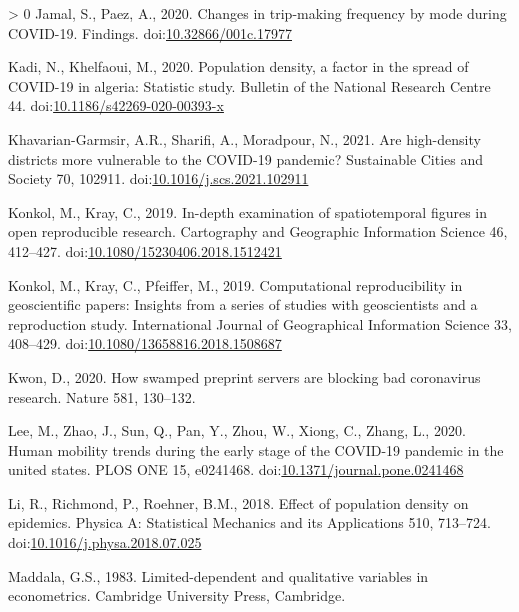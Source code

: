 \documentclass[]{elsarticle} %
\newlength{\cslhangindent}
\newenvironment{CSLReferences}[3] %
 {%
  \setlength{\parindent}{0pt}
  \ifodd #1 \everypar{\setlength{\hangindent}{\cslhangindent}}\ignorespaces\fi
  \ifnum #2 > 0
  \setlength{\parskip}{#2\baselineskip}
  \fi
 }%
 {}
\begin{document}
\begin{CSLReferences}{1}{0}
\leavevmode\hypertarget{ref-Jamal2020Changes}{}%
Jamal, S., Paez, A., 2020. Changes in trip-making frequency by mode
during COVID-19. Findings.
doi:\href{https://doi.org/10.32866/001c.17977}{10.32866/001c.17977}

\leavevmode\hypertarget{ref-Kadi2020population}{}%
Kadi, N., Khelfaoui, M., 2020. Population density, a factor in the
spread of COVID-19 in algeria: Statistic study. Bulletin of the National
Research Centre 44.
doi:\href{https://doi.org/10.1186/s42269-020-00393-x}{10.1186/s42269-020-00393-x}

\leavevmode\hypertarget{ref-Khavarian2021high}{}%
Khavarian-Garmsir, A.R., Sharifi, A., Moradpour, N., 2021. Are
high-density districts more vulnerable to the COVID-19 pandemic?
Sustainable Cities and Society 70, 102911.
doi:\href{https://doi.org/10.1016/j.scs.2021.102911}{10.1016/j.scs.2021.102911}

\leavevmode\hypertarget{ref-Konkol2019examination}{}%
Konkol, M., Kray, C., 2019. In-depth examination of spatiotemporal
figures in open reproducible research. Cartography and Geographic
Information Science 46, 412--427.
doi:\href{https://doi.org/10.1080/15230406.2018.1512421}{10.1080/15230406.2018.1512421}

\leavevmode\hypertarget{ref-Konkol2019computational}{}%
Konkol, M., Kray, C., Pfeiffer, M., 2019. Computational reproducibility
in geoscientific papers: Insights from a series of studies with
geoscientists and a reproduction study. International Journal of
Geographical Information Science 33, 408--429.
doi:\href{https://doi.org/10.1080/13658816.2018.1508687}{10.1080/13658816.2018.1508687}

\leavevmode\hypertarget{ref-Kwon2021swamped}{}%
Kwon, D., 2020. How swamped preprint servers are blocking bad
coronavirus research. Nature 581, 130--132.

\leavevmode\hypertarget{ref-Lee2020human}{}%
Lee, M., Zhao, J., Sun, Q., Pan, Y., Zhou, W., Xiong, C., Zhang, L.,
2020. Human mobility trends during the early stage of the COVID-19
pandemic in the united states. PLOS ONE 15, e0241468.
doi:\href{https://doi.org/10.1371/journal.pone.0241468}{10.1371/journal.pone.0241468}

\leavevmode\hypertarget{ref-Li2018effect}{}%
Li, R., Richmond, P., Roehner, B.M., 2018. Effect of population density
on epidemics. Physica A: Statistical Mechanics and its Applications 510,
713--724.
doi:\href{https://doi.org/10.1016/j.physa.2018.07.025}{10.1016/j.physa.2018.07.025}

\leavevmode\hypertarget{ref-Maddala1983limited}{}%
Maddala, G.S., 1983. Limited-dependent and qualitative variables in
econometrics. Cambridge University Press, Cambridge.


\end{CSLReferences}
\end{document}
